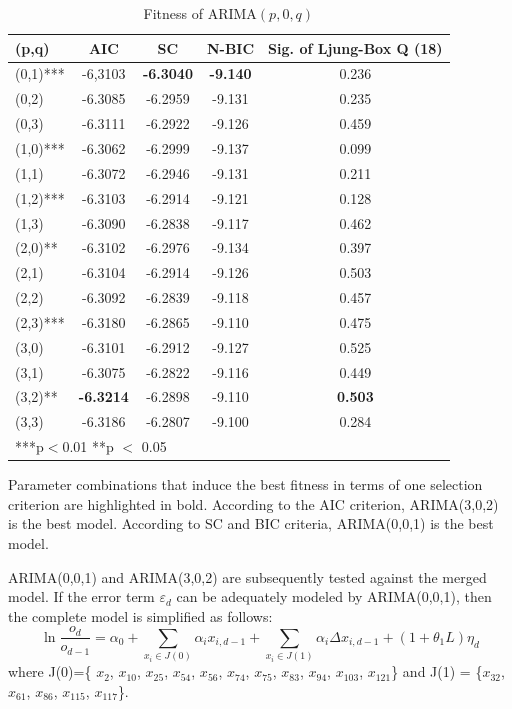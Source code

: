 \documentclass[review,3p,times,12pt,number]{elsarticle}
\begin{document}
\begin{table}[htbp]
\caption{Fitness of ARIMA$(p,0,q)$}
\center
\label{tab:select-pq}
\begin{tabular} {l c c c c}
\hline
(p,q)    & AIC & SC & N-BIC & Sig. of Ljung-Box Q (18)\\
\hline
(0,1)*** & -6,3103 & \bf{-6.3040} & \bf{-9.140} & 0.236 \\
(0,2)	 &-6.3085	&-6.2959	&-9.131	&0.235\\
(0,3)	 &-6.3111	&-6.2922	&-9.126	&0.459\\
(1,0)***	&-6.3062	&-6.2999	&-9.137	&0.099\\
(1,1)	 &-6.3072	&-6.2946	&-9.131	&0.211\\
(1,2)***	&-6.3103	&-6.2914	&-9.121	&0.128\\
(1,3)	 &-6.3090	&-6.2838	&-9.117	&0.462\\
(2,0)**	 &-6.3102	&-6.2976	&-9.134	&0.397\\
(2,1)	 &-6.3104	&-6.2914	&-9.126	&0.503\\
(2,2)	 &-6.3092	&-6.2839	&-9.118	&0.457\\
(2,3)***	&-6.3180	&-6.2865	&-9.110	&0.475\\
(3,0)	 &-6.3101	&-6.2912	&-9.127	&0.525\\
(3,1)	 &-6.3075	&-6.2822	&-9.116	&0.449\\
(3,2)**	 &\bf{-6.3214}	&-6.2898	&-9.110	&\bf{0.503}\\
(3,3)	 &-6.3186	&-6.2807	&-9.100	&0.284\\
\hline
\multicolumn{5}{l}{***p$<$0.01 **p $<$ 0.05}
\end{tabular}
\end{table}

Parameter combinations that induce the best fitness in terms of one selection criterion are highlighted in bold. According to the AIC criterion, ARIMA(3,0,2) is the best model. According to SC and BIC criteria, ARIMA(0,0,1) is the best model.

ARIMA(0,0,1) and ARIMA(3,0,2) are subsequently tested against the merged model. If the error term $\varepsilon_d$ can be adequately modeled by ARIMA(0,0,1), then the complete model is simplified as follows:
\begin{equation}
    \ln \frac{o_d}{o_{d-1}} = \alpha_0 + \sum_{x_i \in J(0)} \alpha_i x_{i,d-1} + \sum_{x_i \in J(1)} \alpha_i \Delta x_{i,d-1} + (1 + \theta_1 L) \eta_d \label{eqn:arima1}
\end{equation}
where J(0)=\{ $x_2$, $x_{10}$, $x_{25}$, $x_{54}$, $x_{56}$, $x_{74}$, $x_{75}$, $x_{83}$, $x_{94}$, $x_{103}$, $x_{121}$\} and J(1) = \{$x_{32}$, $x_{61}$, $x_{86}$, $x_{115}$, $x_{117}$\}.
\end{document}
